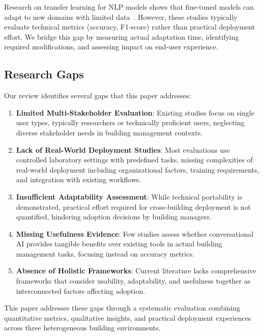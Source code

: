 \documentclass[acmlarge]{acmart}
\begin{document}
Research on transfer learning for NLP models shows that fine-tuned models can adapt to new domains with limited data~\cite{Huang2023}. However, these studies typically evaluate technical metrics (accuracy, F1-score) rather than practical deployment effort. We bridge this gap by measuring actual adaptation time, identifying required modifications, and assessing impact on end-user experience.

\subsection{Research Gaps}

Our review identifies several gaps that this paper addresses:

\begin{enumerate}
    \item \textbf{Limited Multi-Stakeholder Evaluation}: Existing studies focus on single user types, typically researchers or technically proficient users, neglecting diverse stakeholder needs in building management contexts.
    
    \item \textbf{Lack of Real-World Deployment Studies}: Most evaluations use controlled laboratory settings with predefined tasks, missing complexities of real-world deployment including organizational factors, training requirements, and integration with existing workflows.
    
    \item \textbf{Insufficient Adaptability Assessment}: While technical portability is demonstrated, practical effort required for cross-building deployment is not quantified, hindering adoption decisions by building managers.
    
    \item \textbf{Missing Usefulness Evidence}: Few studies assess whether conversational AI provides tangible benefits over existing tools in actual building management tasks, focusing instead on accuracy metrics.
    
    \item \textbf{Absence of Holistic Frameworks}: Current literature lacks comprehensive frameworks that consider usability, adaptability, and usefulness together as interconnected factors affecting adoption.
\end{enumerate}

This paper addresses these gaps through a systematic evaluation combining quantitative metrics, qualitative insights, and practical deployment experiences across three heterogeneous building environments.
\end{document}
